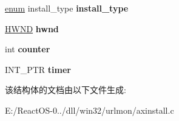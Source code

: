 \begin{DoxyCompactItemize}
\hyperlink{interfaceenum}{enum} install\+\_\+type {\bfseries install\+\_\+type}
\item 
\mbox{\label{structinstall__ctx__t_ae3c5bad322d0478bd8cc28738660ad54}} 
\hyperlink{interfacevoid}{H\+W\+ND} {\bfseries hwnd}
\item 
\mbox{\label{structinstall__ctx__t_a8df2b6222e2a979dc0fabd2834aad8a1}} 
int {\bfseries counter}
\item 
\mbox{\label{structinstall__ctx__t_a07cfc2ceadade7753580c7056fb17da0}} 
I\+N\+T\+\_\+\+P\+TR {\bfseries timer}
\end{DoxyCompactItemize}


该结构体的文档由以下文件生成\+:\begin{DoxyCompactItemize}
\item 
E\+:/\+React\+O\+S-\/0../dll/win32/urlmon/axinstall.\+c\end{DoxyCompactItemize}
